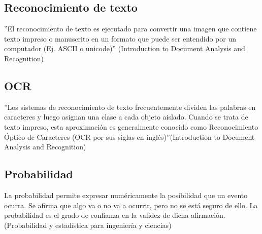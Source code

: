 \subsection{Reconocimiento de texto} 
''El reconocimiento de texto es ejecutado para convertir una imagen 
que contiene texto impreso o manuscrito en un formato que puede ser 
entendido por un computador (Ej. ASCII o unicode)'' (Introduction to Document Analysis and Recognition)

\subsection{OCR}
''Los sistemas de reconocimiento de texto frecuentemente dividen las 
palabras en caracteres y luego asignan una clase a cada objeto aislado.
Cuando se trata de texto impreso, esta aproximaci\'on es generalmente 
conocido como Reconocimiento Óptico de Caracteres (OCR por sus siglas 
en ingl\'es)''(Introduction to Document Analysis and Recognition)


\subsection{Probabilidad}
La probabilidad permite expresar num\'ericamente la posibilidad que un 
evento ocurra.  Se afirma que algo va o no va a ocurrir, pero no se 
est\'a seguro de ello. La probabilidad es el grado de confianza en la 
validez de dicha afirmaci\'on.(Probabilidad y estad\'istica para ingenier\'ia y ciencias)

\pagebreak